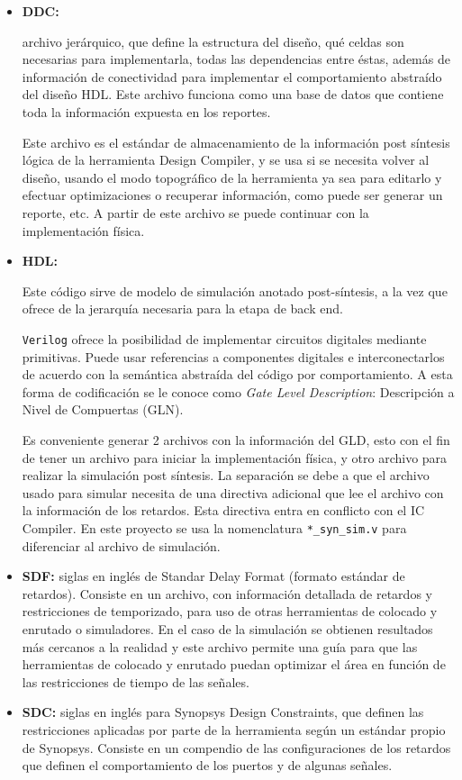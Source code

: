\begin{itemize}
\item \textbf{DDC:} {archivo jerárquico, que define la estructura del diseño, qué celdas son necesarias para implementarla, todas las dependencias entre éstas, además de información de conectividad para implementar el comportamiento abstraído del diseño HDL. Este archivo funciona como una base de datos que contiene toda la información expuesta en los reportes.

Este archivo es el estándar de almacenamiento de la información post síntesis lógica de la herramienta Design Compiler, y se usa si se necesita volver al diseño, usando el modo topográfico de la herramienta ya sea para editarlo y efectuar optimizaciones o recuperar información, como puede ser generar un reporte, etc. A partir de este archivo se puede continuar con la implementación física.}

\item \textbf{HDL:} {Este código sirve de modelo de simulación anotado post-síntesis, a la vez que ofrece de la jerarquía necesaria para la etapa de back end.

\texttt{Verilog} ofrece la posibilidad de implementar circuitos digitales mediante primitivas. Puede usar referencias a componentes digitales e interconectarlos de acuerdo con la semántica abstraída del código por comportamiento. A esta forma de codificación se le conoce como \textit{Gate Level Description}: Descripción a Nivel de Compuertas (GLN).

Es conveniente generar 2 archivos con la información del GLD, esto con el fin de tener un archivo para iniciar la implementación física, y otro archivo para realizar la simulación post síntesis. La separación se debe a que el archivo usado para simular necesita de una directiva adicional que lee el archivo con la información de los retardos. Esta directiva entra en conflicto con el IC Compiler. En este proyecto se usa la nomenclatura \texttt{*\_syn\_sim.v} para diferenciar al archivo de simulación.}

\item \textbf{SDF:} {siglas en inglés de Standar Delay Format (formato estándar de retardos). Consiste en un archivo, con información detallada de retardos y restricciones de temporizado, para uso de otras herramientas de colocado y enrutado o simuladores. En el caso de la simulación se obtienen resultados más cercanos a la realidad y este archivo permite una guía para que las herramientas de colocado y enrutado puedan optimizar el área en función de las restricciones de tiempo de las señales.}

\item \textbf{SDC:} {siglas en inglés para Synopsys Design Constraints, que definen las restricciones aplicadas por parte de la herramienta según un estándar propio de Synopsys. Consiste en un compendio de las configuraciones de los retardos que definen el comportamiento de los puertos y de algunas señales.}

\end{itemize}

